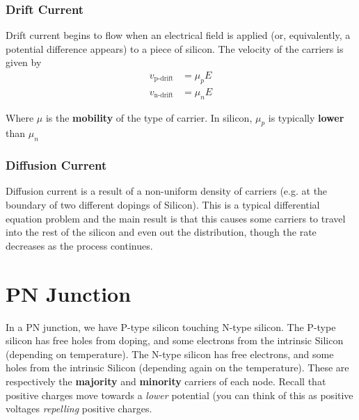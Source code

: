 \documentclass[11pt]{report}
\begin{document}
\subsubsection{Drift Current}
Drift current begins to flow when an electrical field is applied (or, equivalently, a potential difference appears) to a piece of silicon. The velocity of the carriers is given by
\begin{align*}
		v_{\text{p-drift}} &= \mu_p E \\
		v_{\text{n-drift}} &= \mu_n E
\end{align*}

Where $\mu$ is the \textbf{mobility} of the type of carrier. In silicon, $\mu_p$ is typically \textbf{lower} than $\mu_n$


\subsubsection{Diffusion Current}
Diffusion current is a result of a non-uniform density of carriers (e.g. at the boundary of two different dopings of Silicon). This is a typical differential equation problem and the main result is that this causes some carriers to travel into the rest of the silicon and even out the distribution, though the rate decreases as the process continues.

\section{PN Junction}

\begin{center}
\end{center}

In a PN junction, we have P-type silicon touching N-type silicon. The P-type silicon has free holes from doping, and some electrons from the intrinsic Silicon (depending on temperature). The N-type silicon has free electrons, and some holes from the intrinsic Silicon (depending again on the temperature). These are respectively the \textbf{majority} and \textbf{minority} carriers of each node. Recall that positive charges move towards a \textit{lower} potential (you can think of this as positive voltages \textit{repelling} positive charges.
\end{document}
